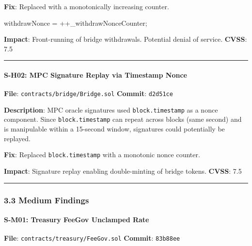 \documentclass[
]{article}
\newenvironment{Shaded}{}{}
\newcommand{\NormalTok}[1]{#1}
\begin{document}
\textbf{Fix}: Replaced with a monotonically increasing counter.

\begin{Shaded}
\begin{Highlighting}[]
\NormalTok{withdrawNonce = ++\_withdrawNonceCounter;}
\end{Highlighting}
\end{Shaded}

\textbf{Impact}: Front-running of bridge withdrawals. Potential denial
of service. \textbf{CVSS}: 7.5

\begin{center}\rule{0.5\linewidth}{0.5pt}\end{center}

\paragraph{S-H02: MPC Signature Replay via Timestamp
Nonce}\label{s-h02-mpc-signature-replay-via-timestamp-nonce}

\textbf{File}: \texttt{contracts/bridge/Bridge.sol} \textbf{Commit}:
\texttt{d2d51ce}

\textbf{Description}: MPC oracle signatures used
\texttt{block.timestamp} as a nonce component. Since
\texttt{block.timestamp} can repeat across blocks (same second) and is
manipulable within a 15-second window, signatures could potentially be
replayed.

\textbf{Fix}: Replaced \texttt{block.timestamp} with a monotonic nonce
counter.

\textbf{Impact}: Signature replay enabling double-minting of bridge
tokens. \textbf{CVSS}: 7.5

\begin{center}\rule{0.5\linewidth}{0.5pt}\end{center}

\subsubsection{3.3 Medium Findings}\label{33-medium-findings}

\paragraph{S-M01: Treasury FeeGov Unclamped
Rate}\label{s-m01-treasury-feegov-unclamped-rate}

\textbf{File}: \texttt{contracts/treasury/FeeGov.sol} \textbf{Commit}:
\texttt{83b88ee}
\end{document}
